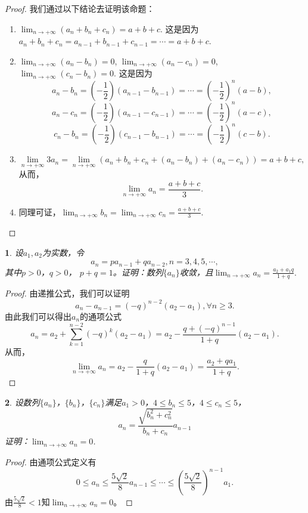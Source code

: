 \documentclass[utf8]{book}
\newtheorem{example}{}[section]             %
\begin{document}
\begin{proof}
我们通过以下结论去证明该命题：
\begin{enumerate}
\renewcommand\labelenumi{\normalfont(\theenumi)}
\item $\displaystyle \lim_{n\to +\infty}(a_n + b_n + c_n) = a+b+c$. 这是因为$a_n + b_n + c_n = a_{n-1}+b_{n-1}+c_{n-1} = \cdots = a+b+c$.
\item $\displaystyle \lim_{n\to +\infty}(a_n -b_n) = 0$, $\displaystyle \lim_{n\to +\infty}(a_n -c_n) = 0$, $\displaystyle \lim_{n\to +\infty}(c_n -b_n) = 0$.
这是因为$$a_n - b_n = \left(-\frac{1}{2}\right)(a_{n-1}-b_{n-1}) = \cdots = \left(-\frac{1}{2}\right)^n(a-b),$$
$$a_n - c_n = \left(-\frac{1}{2}\right)(a_{n-1}-c_{n-1}) = \cdots = \left(-\frac{1}{2}\right)^n(a-c),$$
$$c_n - b_n = \left(-\frac{1}{2}\right)(c_{n-1}-b_{n-1}) = \cdots = \left(-\frac{1}{2}\right)^n(c-b).$$
\item $$\displaystyle \lim_{n\to +\infty}3a_n = \lim_{n\to +\infty}(a_n+b_n+c_n +(a_n-b_n) + (a_n-c_n))=a+b+c,$$
从而， $$\displaystyle \lim_{n\to +\infty}a_n  = \frac{a+b+c}{3}.$$
\item 同理可证，$\displaystyle \lim_{n\to +\infty}b_n=\lim_{n\to +\infty}c_n = \frac{a+b+c}{3}$.
\end{enumerate}

\end{proof}
\begin{example}
设$a_1,a_2$为实数，令$$a_n = pa_{n-1} + qa_{n-2}, n = 3,4,5,\cdots,$$
其中$p>0$，$q>0$， $p+q = 1$。证明：数列$\{a_n\}$收敛，且$\displaystyle \lim_{n\to +\infty}a_n=\frac{a_2+a_1q}{1+q}.$
\end{example}
\begin{proof}
由递推公式，我们可以证明$$a_n-a_{n-1} =\left(-q\right)^{n-2}(a_2 - a_1), \forall n \geq 3.$$
由此我们可以得出$a_n$的通项公式
$$a_n = a_2 + \displaystyle \sum_{k=1}^{n-2}\left(-q\right)^k(a_2 - a_1) = a_2 - \frac{q+(-q)^{n-1}}{1+q}(a_2-a_1).$$
从而，$$\displaystyle \lim_{n\to +\infty}a_n = a_2 - \frac{q}{1+q}(a_2-a_1) = \frac{a_2+qa_1}{1+q}.$$
\end{proof}
\begin{example}
设数列$\{a_n\}$，$\{b_n\}$，$\{c_n\}$满足$a_1 > 0$，$4 \leq b_n \leq 5$，$4 \leq c_n \leq 5$，$$\displaystyle a_n=\frac{\sqrt{b_n^2+c_n^2}}{b_n+c_n}a_{n-1}$$
证明：$\displaystyle \lim_{n\to +\infty}a_n=0$.
\end{example}
\begin{proof}
由通项公式定义有$$0\leq a_n \leq \frac{5\sqrt 2}{8}a_{n-1} \leq \cdots \leq \left(\frac{5\sqrt 2}{8}\right)^{n-1}a_1.$$
由$\displaystyle\frac{5\sqrt 2}{8} < 1$知$\displaystyle \lim_{n\to +\infty}a_n=0$。
\end{proof}
\end{document}
